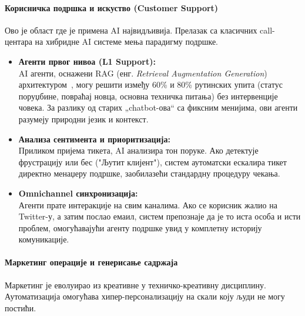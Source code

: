 \paragraph*{Корисничка подршка и искуство (Customer Support)}
\noindent
Ово је област где је примена AI највидљивија. Прелазак са класичних call-центара на хибридне AI системе мења парадигму подршке.

\begin{itemize}
    \item \textbf{Агенти првог нивоа (L1 Support):} \\
    AI агенти, оснажени RAG (енг. \textit{Retrieval Augmentation Generation}) архитектуром~\cite{lewis2020rag,gao2024ragsurvey}, могу решити између 60\% и 80\% рутинских упита (статус поруџбине, повраћај новца, основна техничка питања) без интервенције човека. За разлику од старих „chatbot-ова“ са фиксним менијима, ови агенти разумеју природни језик и контекст.
    
    \item \textbf{Анализа сентимента и приоритизација:} \\
    Приликом пријема тикета, AI анализира тон поруке. Ако детектује фрустрацију или бес ("Љутит клијент"), систем аутоматски ескалира тикет директно менаџеру подршке, заобилазећи стандардну процедуру чекања.
    
    \item \textbf{Omnichannel синхронизација:} \\
    Агенти прате интеракције на свим каналима. Ако се корисник жалио на Twitter-у, а затим послао емаил, систем препознаје да је то иста особа и исти проблем, омогућавајући агенту подршке увид у комплетну историју комуникације.
\end{itemize}

\paragraph{Маркетинг операције и генерисање садржаја}
\noindent
Маркетинг је еволуирао из креативне у техничко-креативну дисциплину. Аутоматизација омогућава хипер-персонализацију на скали коју људи не могу постићи.


